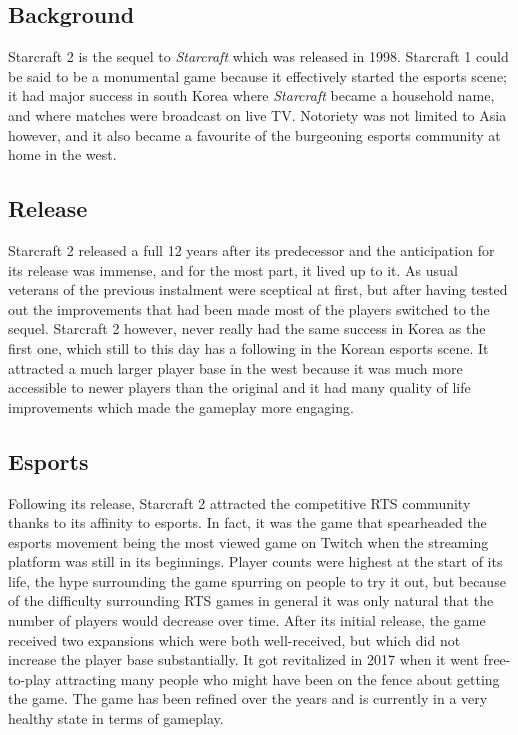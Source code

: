 \documentclass[a4paper,10pt]{book}
\begin{document}
 \subsection{Background }
 
          Starcraft 2 is the sequel to  \textit{Starcraft } which was released in 1998. Starcraft 1 could be said to be a
          monumental game because it effectively started the esports scene; it had major success in south
          Korea where  \textit{Starcraft } became a household name, and where matches were broadcast on live TV.
          Notoriety was not limited to Asia however, and it also became a favourite of the burgeoning esports
          community at home in the west.
         
 
 \subsection{Release }
 
          Starcraft 2 released a full 12 years after its predecessor and the anticipation for its release was
          immense, and for the most part, it lived up to it. As usual veterans of the previous instalment were
          sceptical at first, but after having tested out the improvements that had been made most of the
          players switched to the sequel. Starcraft 2 however, never really had the same success in Korea as
          the first one, which still to this day has a following in the Korean esports scene. It attracted a much
          larger player base in the west because it was much more accessible to newer players than the
          original and it had many quality of life improvements which made the gameplay more engaging.
         
 
 \subsection{Esports }
 
          Following its release, Starcraft 2 attracted the competitive RTS community thanks to its affinity to
          esports. In fact, it was the game that spearheaded the esports movement being the most viewed
          game on Twitch when the streaming platform was still in its beginnings. Player counts were highest
          at the start of its life, the hype surrounding the game spurring on people to try it out, but because of
          the difficulty surrounding RTS games in general it was only natural that the number of players would
          decrease over time. After its initial release, the game received two expansions which were both well-received, but which did not increase the player base substantially. It got revitalized in 2017 when it
          went free-to-play attracting many people who might have been on the fence about getting the
          game. The game has been refined over the years and is currently in a very healthy state in terms of
          gameplay.
         
\end{document}
